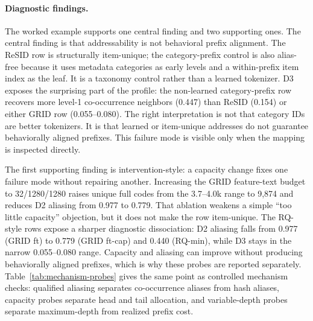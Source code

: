 \paragraph{Diagnostic findings.}
The worked example supports one central finding and two supporting ones. The
central finding is that addressability is not behavioral prefix alignment. The
ReSID row is structurally item-unique; the category-prefix control is also
alias-free because it uses metadata categories as early levels and a
within-prefix item index as the leaf. It is a taxonomy control rather than a
learned tokenizer. D3 exposes the surprising part of the profile: the
non-learned category-prefix row recovers
more level-1 co-occurrence neighbors (0.447) than ReSID (0.154) or either
GRID row (0.055--0.080). The right interpretation is not that category IDs
are better tokenizers. It is that learned or item-unique addresses do not
guarantee behaviorally aligned prefixes. This failure mode is visible only when
the mapping is inspected directly.

The first supporting finding is intervention-style: a capacity change fixes one
failure mode without repairing another. Increasing the GRID feature-text budget to
32/1280/1280 raises unique full codes from the 3.7--4.0k range to 9,874 and
reduces D2 aliasing from 0.977 to 0.779. That ablation weakens a simple
``too little capacity'' objection, but it does not make the row item-unique.
The RQ-style rows expose a sharper diagnostic dissociation: D2 aliasing falls
from 0.977 (GRID ft) to 0.779 (GRID ft-cap) and 0.440 (RQ-min), while D3
stays in the narrow 0.055--0.080 range. Capacity and aliasing can improve
without producing behaviorally aligned prefixes, which is why these probes are
reported separately. Table~\ref{tab:mechanism-probes} gives the same point as
controlled mechanism checks: qualified aliasing separates co-occurrence aliases
from hash aliases, capacity probes separate head and tail allocation, and
variable-depth probes separate maximum-depth from realized prefix cost.

